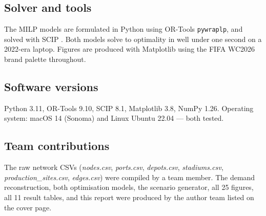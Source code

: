 \documentclass[11pt,a4paper]{article}
\numberwithin{equation}{section}
\newcommand{\code}[1]{\texttt{\small #1}}
\newcommand{\filename}[1]{\textit{\small #1}}
\begin{document}
\subsection*{Solver and tools}
The MILP models are formulated in Python using OR-Tools \cite{ortools} \code{pywraplp}, and solved with SCIP \cite{scip}. Both models solve to optimality in well under one second on a 2022-era laptop. Figures are produced with Matplotlib using the FIFA WC2026 brand palette throughout.

\subsection*{Software versions}
Python 3.11, OR-Tools 9.10, SCIP 8.1, Matplotlib 3.8, NumPy 1.26. Operating system: macOS 14 (Sonoma) and Linux Ubuntu 22.04 — both tested.

\subsection*{Team contributions}
The raw network CSVs (\filename{nodes.csv}, \filename{ports.csv}, \filename{depots.csv}, \filename{stadiums.csv}, \filename{production\_sites.csv}, \filename{edges.csv}) were compiled by a team member. The demand reconstruction, both optimisation models, the scenario generator, all 25 figures, all 11 result tables, and this report were produced by the author team listed on the cover page.
\end{document}
